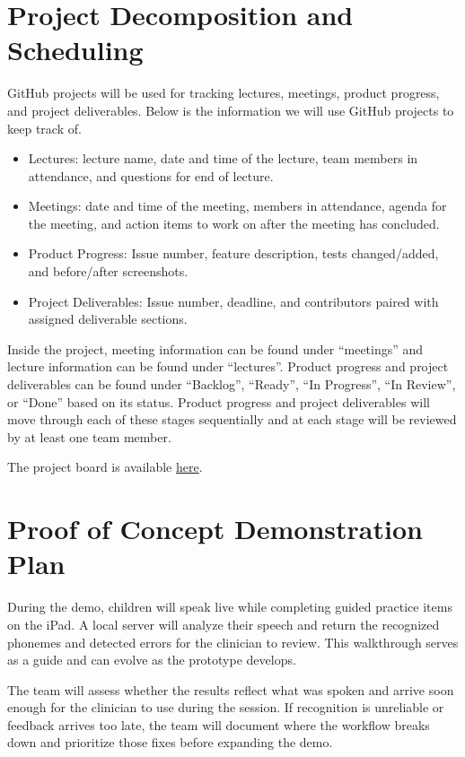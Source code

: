 \documentclass{article}
\begin{document}
\section{Project Decomposition and Scheduling}

GitHub projects will be used for tracking lectures, meetings, product progress, and project deliverables.  
Below is the information we will use GitHub projects to keep track of. 

\begin{itemize}
  \item Lectures: lecture name, date and time of the lecture, team members in attendance, and questions for end of lecture.  
  \item Meetings: date and time of the meeting, members in attendance, agenda for the meeting, and action items to work on after the meeting has concluded. 
  \item Product Progress: Issue number, feature description, tests changed/added, and before/after screenshots. 
  \item Project Deliverables: Issue number, deadline, and contributors paired with assigned deliverable sections. 
\end{itemize}

Inside the project, meeting information can be found under “meetings” and lecture information can be found under “lectures”. Product progress and project deliverables can be found under “Backlog”, “Ready”, “In Progress”, “In Review”, or “Done” based on its status. Product progress and project deliverables will move through each of these stages sequentially and at each stage will be reviewed by at least one team member. 

The project board is available \href{https://github.com/users/lilyporter/projects/3/views/1}{here}.

\section{Proof of Concept Demonstration Plan}

During the demo, children will speak live while completing guided practice
items on the iPad. A local server will analyze their speech and return the
recognized phonemes and detected errors for the clinician to review. This
walkthrough serves as a guide and can evolve as the prototype develops.

The team will assess whether the results reflect what was spoken and arrive
soon enough for the clinician to use during the session. If recognition is
unreliable or feedback arrives too late, the team will document where the
workflow breaks down and prioritize those fixes before expanding the demo.
\end{document}
